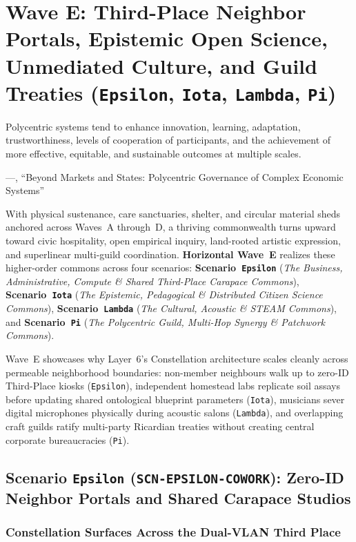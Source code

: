 \chapter{Wave E: Third-Place Neighbor Portals, Epistemic Open Science, Unmediated Culture, and Guild Treaties (\texttt{Epsilon}, \texttt{Iota}, \texttt{Lambda}, \texttt{Pi})}
\label{ch:wave-e}

\epigraph{Polycentric systems tend to enhance innovation, learning, adaptation, trustworthiness, levels of cooperation of participants, and the achievement of more effective, equitable, and sustainable outcomes at multiple scales.}{---\textcite{ostrom2010}, ``Beyond Markets and States: Polycentric Governance of Complex Economic Systems''}

With physical sustenance, care sanctuaries, shelter, and circular material sheds anchored across Waves~A through~D, a thriving commonwealth turns upward toward civic hospitality, open empirical inquiry, land-rooted artistic expression, and superlinear multi-guild coordination. \textbf{Horizontal Wave~E} realizes these higher-order commons across four scenarios: \textbf{Scenario~\texttt{Epsilon}} (\textit{The Business, Administrative, Compute \& Shared Third-Place Carapace Commons}), \textbf{Scenario~\texttt{Iota}} (\textit{The Epistemic, Pedagogical \& Distributed Citizen Science Commons}), \textbf{Scenario~\texttt{Lambda}} (\textit{The Cultural, Acoustic \& STEAM Commons}), and \textbf{Scenario~\texttt{Pi}} (\textit{The Polycentric Guild, Multi-Hop Synergy \& Patchwork Commons}).

Wave~E showcases why Layer~6's Constellation architecture scales cleanly across permeable neighborhood boundaries: non-member neighbours walk up to zero-ID Third-Place kiosks (\texttt{Epsilon}), independent homestead labs replicate soil assays before updating shared ontological blueprint parameters (\texttt{Iota}), musicians sever digital microphones physically during acoustic salons (\texttt{Lambda}), and overlapping craft guilds ratify multi-party Ricardian treaties without creating central corporate bureaucracies (\texttt{Pi}).

\section{Scenario \texttt{Epsilon} (\texttt{SCN-EPSILON-COWORK}): Zero-ID Neighbor Portals and Shared Carapace Studios}
\label{sec:wave-e-epsilon}

\subsection{Constellation Surfaces Across the Dual-VLAN Third Place}


